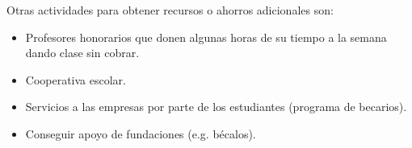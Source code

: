 Otras actividades para obtener recursos o ahorros adicionales son:

\begin{itemize}
	\item Profesores honorarios que donen algunas horas de su tiempo a la semana dando clase sin cobrar.
	\item Cooperativa escolar.
	\item Servicios a las empresas por parte de los estudiantes (programa de becarios).
	\item Conseguir apoyo de fundaciones (e.g. bécalos).
\end{itemize}
